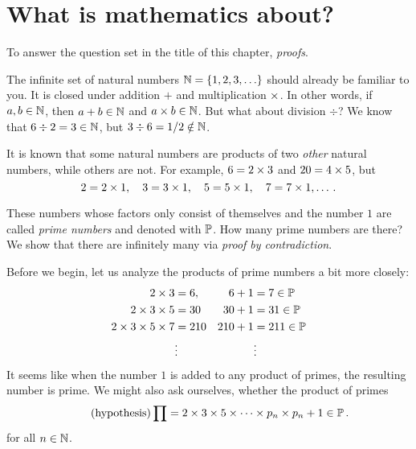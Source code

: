 \documentclass[11pt,a4paper]{article}
\begin{document}

\tableofcontents
\pagebreak
{}


\section{What is mathematics about?}

To answer the question set in the title of this chapter, \emph{proofs}.

\begin{example}
The infinite set of natural numbers \(\mathbb{N} = \{1, 2, 3, \ldots\}\) should already be familiar to you.
It is closed under addition \(+\) and multiplication \(\times\).
In other words, if \(a, b\in\mathbb{N}\), then \(a + b \in\mathbb{N}\) and \(a\times b\in\mathbb{N}\).
But what about division \(\div\)? We know that \(6 \div 2 = 3 \in\mathbb{N}\),
but \(3\div 6 = 1 / 2 \notin\mathbb{N}\).

It is known that some natural numbers are products of two \emph{other} natural numbers,
while others are not. For example, \(6 = 2 \times 3\) and \(20 = 4 \times 5\),
but
\[
2 = 2\times 1,
\quad
3 = 3\times 1,
\quad
5 = 5 \times 1,
\quad
7 = 7 \times 1,
\ldots\,.
\]
\end{example}
These numbers whose factors only consist of themselves and the number \(1\) are called \emph{prime numbers}
and denoted with \(\mathbb{P}\). How many prime numbers are there? We show that there are infinitely many via
\emph{proof by contradiction}.

Before we begin, let us analyze the products of prime numbers a bit more closely:
\begin{align*}
    2 \times 3                   &= 6,   & 6 + 1     &= 7 \in\mathbb{P} \\
    2\times 3 \times 5            &= 30   & 30 + 1    &= 31 \in\mathbb{P} \\
    2 \times 3 \times 5 \times 7   &= 210  & 210 + 1   &= 211\in\mathbb{P}\\
                                &\vdots &           &\vdots
\end{align*}
It seems like when the number \(1\) is added to any product of primes, the resulting number is prime.
We might also ask ourselves, whether the product of primes
\begin{equation*}\tag{hypothesis}
    \prod = 2 \times 3 \times 5 \times\cdots\times p_n \times p_n+1 \in\mathbb{P} \,.
\end{equation*}
for all \(n\in\mathbb{N}\).
\end{document}

